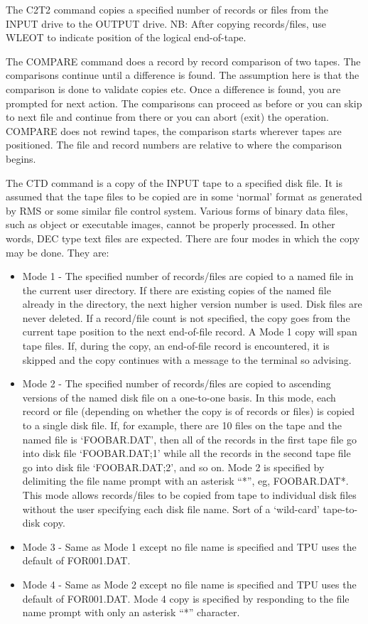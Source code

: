 The C2T2 command copies a specified number of records or files from the INPUT
drive to the OUTPUT drive.
NB: After copying records/files, use WLEOT to indicate position of the logical
end-of-tape.

The COMPARE command does a record by record comparison of two tapes.
The comparisons continue until a difference is found.
The assumption here is that the comparison is done to validate copies etc.
Once a difference is found, you are prompted for next action.
The comparisons can proceed as before or you can skip to next file and continue
from there or you can abort (exit) the operation.
COMPARE does not rewind tapes, the comparison starts wherever tapes are
positioned.
The file and record numbers are relative to where the comparison begins.

The CTD command is a copy of the INPUT tape to a specified disk file.
It is assumed that the tape files to be copied are in some `normal' format as
generated by RMS or some similar file control system.
Various forms of binary data files, such as object or executable images, cannot
be properly processed.
In other words, DEC type text files are expected.
There are four modes in which the copy may be done.
They are:

\begin{itemize}
\item 
Mode 1 - The specified number of records/files are copied to a named file in the
current user directory.
If there are existing copies of the named file already in the directory, the
next higher version number is used.
Disk files are never deleted.
If a record/file count is not specified, the copy goes from the current tape
position to the next end-of-file record.
A Mode 1 copy will span tape files.
If, during the copy, an end-of-file record is encountered, it is skipped and the
copy continues with a message to the terminal so advising.

\item
Mode 2 - The specified number of records/files are copied to ascending versions
of the named disk file on a one-to-one basis.
In this mode, each record or file (depending on whether the copy is of records
or files) is copied to a single disk file.
If, for example, there are 10 files on the tape and the named file is
`FOOBAR.DAT', then all of the records in the first tape file go into disk file
`FOOBAR.DAT;1' while all the records in the second tape file go into disk file
`FOOBAR.DAT;2', and so on.
Mode 2 is specified by delimiting the file name prompt with an asterisk ``*'',
eg, FOOBAR.DAT*.
This mode allows records/files to be copied from tape to individual disk files
without the user specifying each disk file name.
Sort of a `wild-card' tape-to-disk copy.

\item 
Mode 3 - Same as Mode 1 except no file name is specified and TPU uses the
default of FOR001.DAT.

\item
Mode 4 - Same as Mode 2 except no file name is specified and TPU uses the
default of FOR001.DAT.
Mode 4 copy is specified by responding to the file name prompt with only an
asterisk ``*'' character.
\end{itemize}

